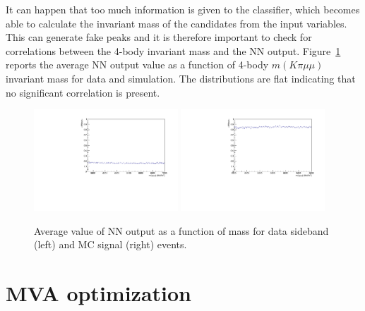 It can happen that too much information is given to the classifier, which becomes able to 
calculate the invariant mass of the candidates from the input variables.
This can generate fake peaks and it is therefore important to check
for correlations between the 4-body invariant mass and the NN output.
Figure~\ref{fig:Lb_NNprofiles} reports the average NN output value as a function of
4-body $m(K\pi\mu\mu)$ invariant mass for data and simulation. The distributions
are flat indicating that no significant correlation is present.
%
\begin{figure}
\centering
\includegraphics[width=0.48\textwidth]{Lmumu/figs/NNout_profile_vs_LbMM_bkgData.pdf}
\includegraphics[width=0.48\textwidth]{Lmumu/figs/NNout_profile_vs_LbMM_MCsignal.pdf}
\caption{Average value of NN output as a function of \Lb mass for data sideband (left) and MC signal (right) events.}
\label{fig:Lb_NNprofiles}
\end{figure}








\section{MVA optimization}
\label{sec:Lb_mva_opt}

